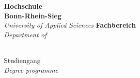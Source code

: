 \begin{titlepage}
    \hfill
    \begin{minipage}[t]{.825\linewidth}
        \raggedright\Large
        \begin{spacing}{0.90}
            \textbf{Hochschule\\Bonn-Rhein-Sieg}\\
            \textit{University of Applied Sciences}
            \linebreak
            \linebreak
            \textbf{Fachbereich \ThesisStudyCourseDepartmentGerman}\\
            \textit{Department of \ThesisStudyCourseDepartment}
        \end{spacing}
    \end{minipage}

    \vspace{\baselineskip*4}

    \begin{center}
        \begin{spacing}{1.25}
            \fontsize{26}{26}\normalfont\ThesisSubjectType\\
            \large\normalfont Studiengang \ThesisType~\ThesisStudyCourseGerman\\
            \large\normalfont \textit{Degree programme \ThesisType~\ThesisStudyCourse}

            \vspace{\baselineskip*4}

            \fontsize{20}{20}\normalfont\ThesisTitle\\
            \fontsize{20}{20}\normalfont\ThesisSubject
        \end{spacing}
    \end{center}

    \vfill


\end{titlepage}
